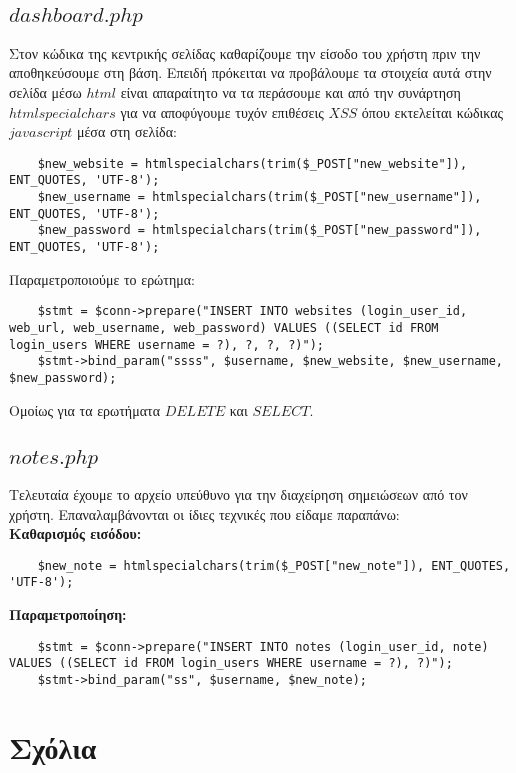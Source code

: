\documentclass{report}
\begin{document}
\subsection*{$dashboard.php$}
Στον κώδικα της κεντρικής σελίδας καθαρίζουμε την είσοδο του χρήστη πριν την αποθηκεύσουμε στη βάση.
Επειδή πρόκειται να προβάλουμε τα στοιχεία αυτά στην σελίδα μέσω $html$ είναι απαραίτητο να τα περάσουμε 
και από την συνάρτηση $htmlspecialchars$ για να αποφύγουμε τυχόν επιθέσεις $XSS$ όπου εκτελείται κώδικας
$javascript$ μέσα στη σελίδα:
\begin{verbatim}
    $new_website = htmlspecialchars(trim($_POST["new_website"]), ENT_QUOTES, 'UTF-8');
    $new_username = htmlspecialchars(trim($_POST["new_username"]), ENT_QUOTES, 'UTF-8');
    $new_password = htmlspecialchars(trim($_POST["new_password"]), ENT_QUOTES, 'UTF-8');
\end{verbatim}
Παραμετροποιούμε το ερώτημα:
\begin{verbatim}
    $stmt = $conn->prepare("INSERT INTO websites (login_user_id, web_url, web_username, web_password) VALUES ((SELECT id FROM login_users WHERE username = ?), ?, ?, ?)");
    $stmt->bind_param("ssss", $username, $new_website, $new_username, $new_password);
\end{verbatim}
Ομοίως για τα ερωτήματα $DELETE$ και $SELECT$.
\subsection*{$notes.php$}
Τελευταία έχουμε το αρχείο υπεύθυνο για την διαχείρηση σημειώσεων από τον χρήστη. Επαναλαμβάνονται 
οι ίδιες τεχνικές που είδαμε παραπάνω:\\
\textbf{Καθαρισμός εισόδου:}
\begin{verbatim}
    $new_note = htmlspecialchars(trim($_POST["new_note"]), ENT_QUOTES, 'UTF-8');
\end{verbatim}
\textbf{Παραμετροποίηση:}
\begin{verbatim}
    $stmt = $conn->prepare("INSERT INTO notes (login_user_id, note) VALUES ((SELECT id FROM login_users WHERE username = ?), ?)");
    $stmt->bind_param("ss", $username, $new_note);
\end{verbatim}
\section*{Σχόλια}
\end{document}
